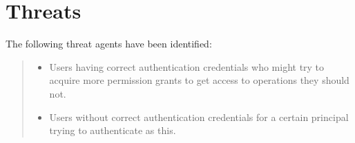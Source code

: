 \documentclass[10pt,a4paper,english]{scrbook}
\begin{document}

\hypertarget{threats}{}
\section{Threats}

The following threat agents have been identified:
\begin{quote}
\begin{itemize}
\item {} 
Users having correct authentication credentials who might try to
acquire more permission grants to get access to operations they
should not.

\item {} 
Users without correct authentication credentials for a certain
principal trying to authenticate as this.

\end{itemize}
\end{quote}
\end{document}
